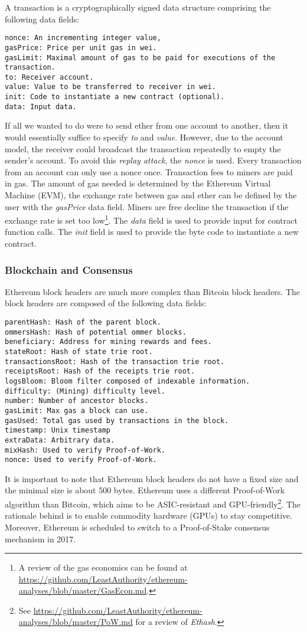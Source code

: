 A transaction is a cryptographically signed data structure comprising the following data fields:
\begin{lstlisting}[breaklines]
nonce: An incrementing integer value,
gasPrice: Price per unit gas in wei.
gasLimit: Maximal amount of gas to be paid for executions of the transaction.
to: Receiver account.
value: Value to be transferred to receiver in wei.
init: Code to instantiate a new contract (optional).
data: Input data. 
\end{lstlisting}
If all we wanted to do were to send ether from one account to another, then it would essentially suffice to specify \emph{to} and \emph{value}. However, due to the account model, the receiver could broadcast the transaction repeatedly to empty the sender's account. To avoid this \emph{replay attack}, the \emph{nonce} is used. Every transaction from an account can only use a nonce once. Transaction fees to miners are paid in gas. The amount of gas needed is determined by the Ethereum Virtual Machine (EVM), the exchange rate between gas and ether can be defined by the user with the \emph{gasPrice} data field. Miners are free decline the transaction if the exchange rate is set too low\footnote{A review of the gas economics can be found at \url{https://github.com/LeastAuthority/ethereum-analyses/blob/master/GasEcon.md}.}. The \emph{data} field is used to provide input for contract function calls. The \emph{init} field is used to provide the byte code to instantiate a new contract. 

\subsubsection{Blockchain and Consensus}

Ethereum block headers are much more complex than Bitcoin block headers. The block headers are composed of the following data fields:
\begin{lstlisting}[breaklines]
parentHash: Hash of the parent block.
ommersHash: Hash of potential ommer blocks.
beneficiary: Address for mining rewards and fees.
stateRoot: Hash of state trie root.
transactionsRoot: Hash of the transaction trie root.
receiptsRoot: Hash of the receipts trie root.
logsBloom: Bloom filter composed of indexable information.
difficulty: (Mining) difficulty level.
number: Number of ancestor blocks.
gasLimit: Max gas a block can use.
gasUsed: Total gas used by transactions in the block.
timestamp: Unix timestamp
extraData: Arbitrary data.
mixHash: Used to verify Proof-of-Work.
nonce: Used to verify Proof-of-Work.
\end{lstlisting}
It is important to note that Ethereum block headers do not have a fixed size and the minimal size is about 500 bytes. Ethereum uses a different Proof-of-Work algorithm than Bitcoin, which aims to be ASIC-resistant and GPU-friendly\footnote{See \url{https://github.com/LeastAuthority/ethereum-analyses/blob/master/PoW.md} for a review of \emph{Ethash}.}. The rationale behind is to enable commodity hardware (GPUs) to stay competitive. Moreover, Ethereum is scheduled to switch to a Proof-of-Stake consensus mechanism in 2017. 

